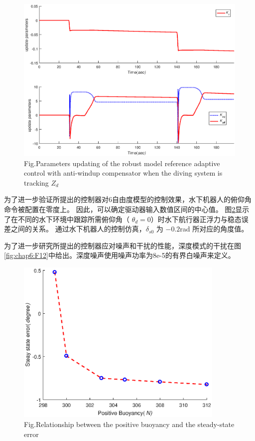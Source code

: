 \begin{figure}[!htp]%
\centering
\includegraphics[width=0.85\linewidth]{figure/chap6/Fig_pulsedepth_2.eps}
\label{fig:chap6:F10}
 {Fig.}{Parameters updating of the robust model reference adaptive control with anti-windup compensator when the diving system is tracking $Z_{d}$
}
\end{figure}


为了进一步验证所提出的控制器对6自由度模型的控制效果，水下机器人的俯仰角命令被配置在零度上。 因此，可以确定驱动器输入数值区间的中心值。 图\ref {fig:chap6:F11}显示了在不同的水下环境中跟踪所需俯仰角（ $\theta_d = 0$）时水下航行器正浮力与稳态误差之间的关系。 通过水下机器人的控制仿真，$\delta_{s0}$ 为 $-0.2$rad 所对应的角度值。

为了进一步研究所提出的控制器应对噪声和干扰的性能，深度模式的干扰在图\ref{fig:chap6:F12}中给出。深度噪声使用噪声功率为8e-5的有界白噪声来定义。

\begin{figure}[!htp]%
\centering
\includegraphics[width=10cm]{figure/chap6/Fig_4.eps}
\label{fig:chap6:F11}
 {Fig.}{Relationship between the positive buoyancy and the steady-state error}
\end{figure}

